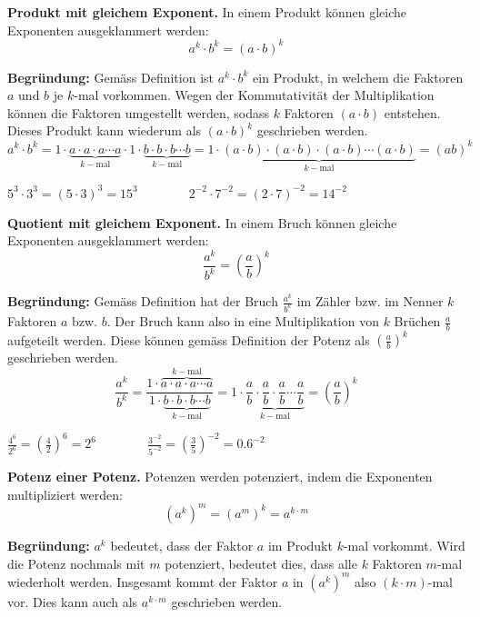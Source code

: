 \begin{theorem}
  \textbf{Produkt mit gleichem Exponent.} In einem Produkt können gleiche Exponenten ausgeklammert werden:
  \[
    a^{k}\cdot b^{k} = (a\cdot b)^{k}
  \]
\end{theorem}
\textbf{Begründung:} Gemäss Definition ist $a^{k}\cdot b^{k}$ ein Produkt, in welchem die Faktoren $a$ und $b$ je $k$-mal vorkommen. Wegen der Kommutativität der Multiplikation können die Faktoren umgestellt werden, sodass $k$ Faktoren $(a\cdot b)$ entstehen. Dieses Produkt kann wiederum als $(a\cdot b)^{k}$ geschrieben werden.
\[
  a^{k}\cdot b^{k} = 1\cdot\underbrace{a\cdot a\cdot a\cdots a}_{k-\text{mal}}\cdot 1\cdot\underbrace{b\cdot b\cdot b\cdots b}_{k-\text{mal}} = 1\cdot\underbrace{(a\cdot b)\cdot (a\cdot b)\cdot (a\cdot b)\cdots (a\cdot b)}_{k-\text{mal}} = (ab)^{k}
\]
\begin{example}
  $\displaystyle 5^{3} \cdot 3^{3} = (5\cdot 3)^{3} = 15^{3} \qquad\qquad 2^{-2}\cdot 7^{-2} = (2\cdot 7)^{-2} = 14^{-2}$
\end{example}
\begin{theorem}
  \textbf{Quotient mit gleichem Exponent.} In einem Bruch können gleiche Exponenten ausgeklammert werden:
  \[
    \frac{a^{k}}{b^{k}} = \left(\frac{a}{b}\right)^{k}
  \]
\end{theorem}
\textbf{Begründung:} Gemäss Definition hat der Bruch $\frac{a^{k}}{b^{k}}$ im Zähler bzw. im Nenner $k$ Faktoren $a$ bzw. $b$. Der Bruch kann also in eine Multiplikation von $k$ Brüchen $\frac{a}{b}$ aufgeteilt werden. Diese können gemäss Definition der Potenz als $\left(\frac{a}{b}\right)^{k}$ geschrieben werden.
\[
  \frac{a^{k}}{b^{k}} = \frac{1\cdot\overbrace{a\cdot a\cdot a\cdots a}^{k-\text{mal}}}{1\cdot\underbrace{b\cdot b\cdot b\cdots b}_{k-\text{mal}}} = 1\cdot\underbrace{\frac{a}{b}\cdot \frac{a}{b}\cdot \frac{a}{b}\cdots \frac{a}{b}}_{k-\text{mal}} = \left(\frac{a}{b}\right)^{k}
\]
\begin{example}
  $\displaystyle \frac{4^{6}}{2^{6}} = \left(\frac{4}{2}\right)^{6} = 2^{6} \qquad\qquad \frac{3^{-2}}{5^{-2}} = \left(\frac{3}{5}\right)^{-2} = 0.6^{-2}$
\end{example}
\begin{theorem}
  \textbf{Potenz einer Potenz.} Potenzen werden potenziert, indem die Exponenten multipliziert werden:
  \[
    \left(a^{k}\right)^{m} = \left(a^{m}\right)^{k}= a^{k\cdot m}
  \]
\end{theorem}
\textbf{Begründung:} $a^{k}$ bedeutet, dass der Faktor $a$ im Produkt $k$-mal vorkommt. Wird die Potenz nochmals mit $m$ potenziert, bedeutet dies, dass alle $k$ Faktoren $m$-mal wiederholt werden. Insgesamt kommt der Faktor $a$ in $\left(a^{k}\right)^{m}$ also $(k\cdot m)$-mal vor. Dies kann auch als $a^{k\cdot m}$ geschrieben werden.
